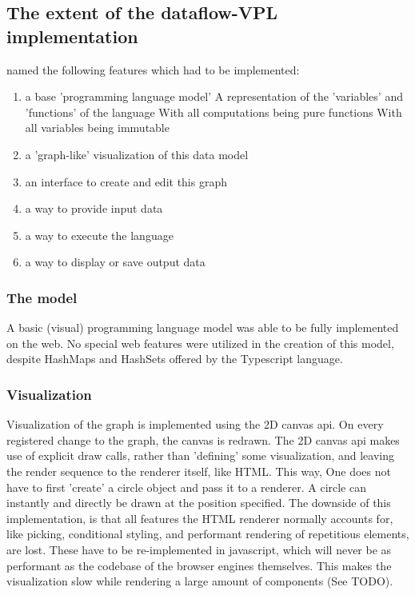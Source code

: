 \subsection*{The extent of the dataflow-VPL implementation}

 named the following features which had to be implemented:
\begin{enumerate}[-]
  \item a base 'programming language model'
  \subitem A representation of the 'variables' and 'functions' of the language
  \subitem With all computations being pure functions
  \subitem With all variables being immutable
  \item a 'graph-like' visualization of this data model
  \item an interface to create and edit this graph 
  \item a way to provide input data 
  \item a way to execute the language
  \item a way to display or save output data
\end{enumerate}

\subsubsection*{The model}
A basic (visual) programming language model was able to be fully implemented on the web. 
No special web features were utilized in the creation of this model, despite HashMaps and HashSets offered by the Typescript language. 

\subsubsection*{Visualization}
Visualization of the graph is implemented using the 2D canvas api.  
On every registered change to the graph, the canvas is redrawn. 
The 2D canvas api makes use of explicit draw calls, rather than 'defining' some visualization, and leaving the render sequence to the renderer itself, like HTML.
This way, One does not have to first 'create' a circle object and pass it to a renderer. 
A circle can instantly and directly be drawn at the position specified.
The downside of this implementation, is that all features the HTML renderer normally accounts for, like picking, conditional styling, and performant rendering of repetitious elements, are lost.
These have to be re-implemented in javascript, which will never be as performant as the codebase of the browser engines themselves. 
This makes the visualization slow while rendering a large amount of components (See TODO). 

